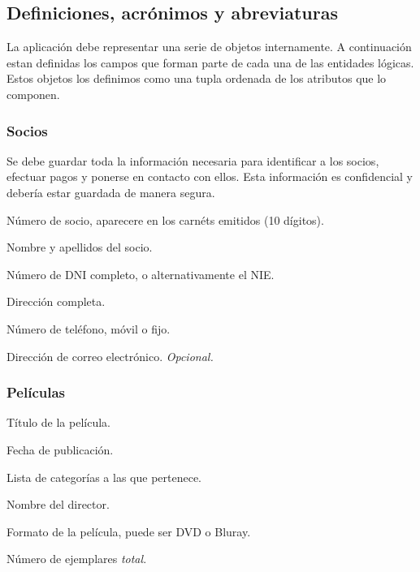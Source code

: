 \subsection{Definiciones, acrónimos y abreviaturas}
La aplicación debe representar una serie de objetos internamente.
A continuación estan definidas los campos que forman parte de cada una de las entidades lógicas.
Estos objetos los definimos como una tupla ordenada de los atributos que lo componen.

\subsubsection{Socios}
Se debe guardar toda la información necesaria para identificar a los socios, efectuar pagos y ponerse en contacto con ellos. Esta información es confidencial y debería estar guardada de manera segura.
\begin{description2}
	\item[UID]              Número de socio, aparecere en los carnéts emitidos (10 dígitos).
	\item[Nombre]           Nombre y apellidos del socio.
	\item[DNI/NIE]          Número de DNI completo, o alternativamente el NIE.
	\item[Dirección]        Dirección completa.
	\item[Teléfono]         Número de teléfono, móvil o fijo.
	\item[Email]            Dirección de correo electrónico. \textit{Opcional.}
\end{description2}

\subsubsection{Películas}
\begin{description2}
	\item[Título]           Título de la película.
	\item[Fecha]            Fecha de publicación.
	\item[Categorías]       Lista de categorías a las que pertenece.
	\item[Director]         Nombre del director.
	\item[Formato]          Formato de la película, puede ser DVD o Bluray.
	\item[Num. ejemplares]  Número de ejemplares \emph{total}.
\end{description2}

